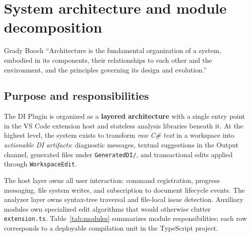 \chapter[System architecture]{System architecture and module decomposition}
\label{chap2:architecture}
\begin{chapquote}{Grady Booch}
``Architecture is the fundamental organization of a system, embodied in its components, their relationships to each other and the environment, and the principles governing its design and evolution.''
\end{chapquote}

\section{Purpose and responsibilities}
\label{chap2:purpose}

The DI Plugin is organized as a \textbf{layered architecture} with a single entry point in the VS Code extension host and stateless analysis libraries beneath it. At the highest level, the system exists to transform \emph{raw C\# text} in a workspace into \emph{actionable DI artifacts}: diagnostic messages, textual suggestions in the Output channel, generated files under \texttt{GeneratedDI/}, and transactional edits applied through \texttt{WorkspaceEdit}.

The host layer owns all user interaction: command registration, progress messaging, file system writes, and subscription to document lifecycle events. The analyzer layer owns syntax-tree traversal and file-local issue detection. Auxiliary modules own specialized edit algorithms that would otherwise clutter \texttt{extension.ts}. Table~\ref{tab:modules} summarizes module responsibilities; each row corresponds to a deployable compilation unit in the TypeScript project.

